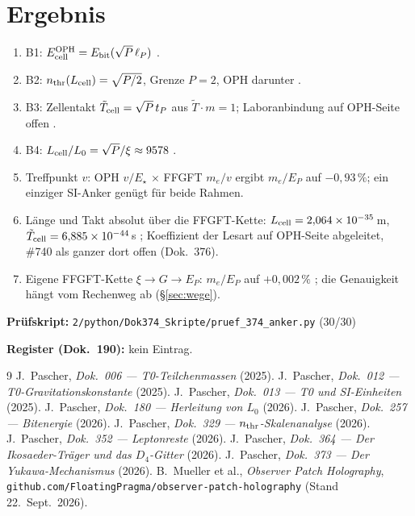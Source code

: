 \section{Ergebnis}

\begin{enumerate}
\item B1: $E_{\rm cell}^{\rm OPH}=E_{\rm bit}(\sqrt P\,\ell_P)$ \BM.
\item B2: $n_{\rm thr}(L_{\rm cell})=\sqrt{P/2}$, Grenze $P=2$, OPH darunter \BM.
\item B3: Zellentakt $\tilde T_{\rm cell}=\sqrt P\,t_P$ aus $\tilde T\cdot m=1$;
  Laboranbindung auf OPH-Seite offen \SM.
\item B4: $L_{\rm cell}/L_0=\sqrt P/\xi\approx 9578$ \KM.
\item Treffpunkt $v$: OPH $v/E_\star$ \QM{} $\times$ FFGFT $m_e/v$ \KM{} ergibt
  $m_e/E_P$ auf $-0{,}93\,\%$; ein einziger SI-Anker genügt für beide Rahmen.
\item Länge und Takt absolut über die FFGFT-Kette: $L_{\rm cell}=2{,}064\times10^{-35}$\,m,
  $\tilde T_{\rm cell}=6{,}885\times10^{-44}$\,s \KM; Koeffizient der Lesart auf
  OPH-Seite abgeleitet, \#740 als ganzer dort offen (Dok.~376).
\item Eigene FFGFT-Kette $\xi\to G\to E_P$: $m_e/E_P$ auf $+0{,}002\,\%$ \KM;
  die Genauigkeit hängt vom Rechenweg ab (§\ref{sec:wege}).
\end{enumerate}

\medskip
\noindent\textbf{Prüfskript:} \texttt{2/python/Dok374\_Skripte/pruef\_374\_anker.py} (30/30)

\medskip
\noindent\textbf{Register (Dok.~190):} kein Eintrag.

\begin{thebibliography}{9}
 J.~Pascher, \emph{Dok.~006 --- T0-Teilchenmassen} (2025).
 J.~Pascher, \emph{Dok.~012 --- T0-Gravitationskonstante} (2025).
 J.~Pascher, \emph{Dok.~013 --- T0 und SI-Einheiten} (2025).
 J.~Pascher, \emph{Dok.~180 --- Herleitung von $L_0$} (2026).
 J.~Pascher, \emph{Dok.~257 --- Bitenergie} (2026).
 J.~Pascher, \emph{Dok.~329 --- $n_{\rm thr}$-Skalenanalyse} (2026).
 J.~Pascher, \emph{Dok.~352 --- Leptonreste} (2026).
 J.~Pascher, \emph{Dok.~364 --- Der Ikosaeder-Träger und das $D_4$-Gitter} (2026).
 J.~Pascher, \emph{Dok.~373 --- Der Yukawa-Mechanismus} (2026).
 B.~Mueller et al., \emph{Observer Patch Holography},
  \texttt{github.com/FloatingPragma/observer-patch-holography} (Stand 22.~Sept.~2026).
\end{thebibliography}
